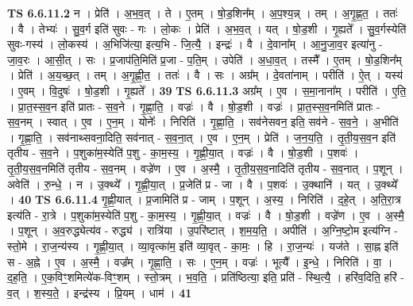\documentclass[17pt]{extarticle}
\begin{document}
                  \newline
                                \textbf{ TS 6.6.11.2} \newline
                  न । प्रेति॑ । अ॒भ॒व॒त् । ते । ए॒तम् । षो॒ड॒शिन᳚म् । अ॒प॒श्य॒न्न् । तम् । अ॒गृ॒ह्ण॒त॒ । ततः॑ । वै । तेभ्यः॑ । सु॒व॒र्ग इति॑ सुवः - गः । लो॒कः । प्रेति॑ । अ॒भ॒व॒त् । यत् । षो॒ड॒शी । गृ॒ह्यते᳚ । सु॒व॒र्गस्येति॑ सुवः-गस्य॑ । लो॒कस्य॑ । अ॒भिजि॑त्या॒ इत्य॒भि - जि॒त्यै॒ । इन्द्रः॑ । वै । दे॒वाना᳚म् । आ॒नु॒जा॒व॒र इत्या॑नु - जा॒व॒रः । आ॒सी॒त् । सः । प्र॒जाप॑ति॒मिति॑ प्र॒जा - प॒ति॒म् । उपेति॑ । अ॒धा॒व॒त् । तस्मै᳚ । ए॒तम् । षो॒ड॒शिन᳚म् । प्रेति॑ । अ॒य॒च्छ॒त् । तम् । अ॒गृ॒ह्णी॒त॒ । ततः॑ । वै । सः । अग्र᳚म् । दे॒वता॑नाम् । परीति॑ । ऐ॒त् । यस्य॑ । ए॒वम् । वि॒दुषः॑ । षो॒ड॒शी । गृ॒ह्यते᳚ । \textbf{  39} \newline
                  \newline
                                \textbf{ TS 6.6.11.3} \newline
                  अग्र᳚म् । ए॒व । स॒मा॒नाना᳚म् । परीति॑ । ए॒ति॒ । प्रा॒त॒स्स॒व॒न इति॑ प्रातः - स॒व॒ने । गृ॒ह्णा॒ति॒ । वज्रः॑ । वै । षो॒ड॒शी । वज्रः॑ । प्रा॒त॒स्स॒व॒नमिति॑ प्रातः - स॒व॒नम् । स्वात् । ए॒व । ए॒न॒म् । योनेः᳚ । निरिति॑ । गृ॒ह्णा॒ति॒ । सव॑नेसवन॒ इति॒ सव॑ने - स॒व॒ने॒ । अ॒भीति॑ । गृ॒ह्णा॒ति॒ । सव॑नाथ्सवना॒दिति॒ सव॑नात् - स॒व॒ना॒त् । ए॒व । ए॒न॒म् । प्रेति॑ । ज॒न॒य॒ति॒ । तृ॒ती॒य॒स॒व॒न इति॑ तृतीय - स॒व॒ने । प॒शुका॑म॒स्येति॑ प॒शु - का॒म॒स्य॒ । गृ॒ह्णी॒या॒त् । वज्रः॑ । वै । षो॒ड॒शी । प॒शवः॑ । तृ॒ती॒य॒स॒व॒नमिति॑ तृतीय - स॒व॒नम् । वज्रे॑ण । ए॒व । अ॒स्मै॒ । तृ॒ती॒य॒स॒व॒नादिति॑ तृतीय - स॒व॒नात् । प॒शून् । अवेति॑ । रु॒न्धे॒ । न । उ॒क्थ्ये᳚ । गृ॒ह्णी॒या॒त् । प्र॒जेति॑ प्र - जा । वै । प॒शवः॑ । उ॒क्थानि॑ । यत् । उ॒क्थ्ये᳚ । \textbf{  40} \newline
                  \newline
                                \textbf{ TS 6.6.11.4} \newline
                  गृ॒ह्णी॒यात् । प्र॒जामिति॑ प्र - जाम् । प॒शून् । अ॒स्य॒ । निरिति॑ । द॒हे॒त् । अ॒ति॒रा॒त्र इत्य॑ति - रा॒त्रे । प॒शुका॑म॒स्येति॑ प॒शु - का॒म॒स्य॒ । गृ॒ह्णी॒या॒त् । वज्रः॑ । वै । षो॒ड॒शी । वज्रे॑ण । ए॒व । अ॒स्मै॒ । प॒शून् । अ॒व॒रुद्ध्येत्य॑व - रुद्ध्य॑ । रात्रि॑या । उ॒परि॑ष्टात् । श॒म॒य॒ति॒ । अपीति॑ । अ॒ग्नि॒ष्टो॒म इत्य॑ग्नि - स्तो॒मे । रा॒ज॒न्य॑स्य । गृ॒ह्णी॒या॒त् । व्या॒वृत्का॑म॒ इति॑ व्या॒वृत् - का॒मः॒ । हि । रा॒ज॒न्यः॑ । यज॑ते । सा॒ह्न इति॑ स - अ॒ह्ने । ए॒व । अ॒स्मै॒ । वज्र᳚म् । गृ॒ह्णा॒ति॒ । सः । ए॒न॒म् । वज्रः॑ । भूत्यै᳚ । इ॒न्धे॒ । निरिति॑ । वा॒ । द॒ह॒ति॒ । ए॒क॒विꣳ॒॒शमित्ये॑क-विꣳ॒॒शम् । स्तो॒त्रम् । भ॒व॒ति॒ । प्रति॑ष्ठित्या॒ इति॒ प्रति॑ - स्थि॒त्यै॒ । हरि॑व॒दिति॒ हरि॑ - व॒त् । श॒स्य॒ते॒ । इन्द्र॑स्य । प्रि॒यम् । धाम॑ । \textbf{  41} \newline
\end{document}

